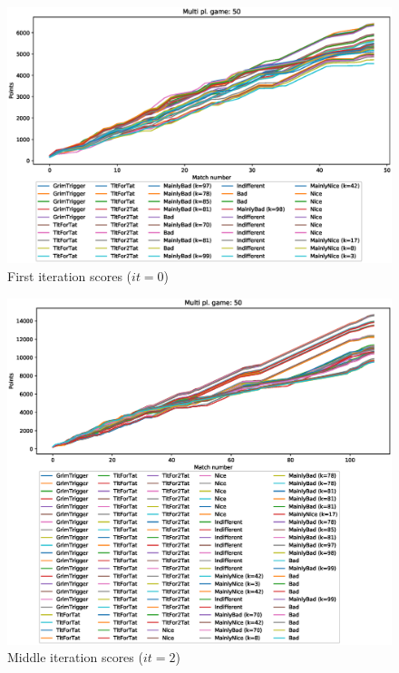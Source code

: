 \documentclass[journal,10pt,twoside]{IEEEtran}
\begin{document}
\begin{figure}[!ht]
    \centering
    \includegraphics[width=1\columnwidth]{../img/ripdmp-incr/alt1/ripdmp-scores-increasing-pop-50-r0}
    \caption{First iteration scores ($it=0$)}
    \label{fig:incrFI}
\end{figure}

\begin{figure}[!ht]
    \centering
    \includegraphics[width=1\columnwidth]{../img/ripdmp-incr/alt1/ripdmp-scores-increasing-pop-50-r2}
    \caption{Middle iteration scores ($it=2$)}
    \label{fig:incrMI}
\end{figure}
\end{document}
